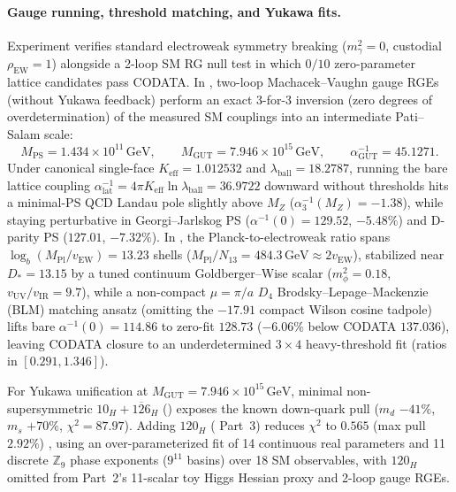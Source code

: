 \paragraph{Gauge running, threshold matching, and Yukawa fits.}
Experiment  verifies standard electroweak symmetry breaking ($m_\gamma^2 = 0$, custodial
$\rho_{\mathrm{EW}} = 1$) alongside a 2-loop SM RG null test in which $0/10$ zero-parameter lattice candidates pass
CODATA. In , two-loop Machacek--Vaughn gauge RGEs \cite{machacek1983} (without Yukawa feedback)
perform an exact 3-for-3 inversion (zero degrees of overdetermination) of the measured SM couplings into an
intermediate Pati--Salam scale:
\begin{equation}
M_{\mathrm{PS}} = 1.434 \times 10^{11}\,\mathrm{GeV},
\qquad
M_{\mathrm{GUT}} = 7.946 \times 10^{15}\,\mathrm{GeV},
\qquad
\alpha_{\mathrm{GUT}}^{-1} = 45.1271.
\label{eq:ps-gut}
\end{equation}
Under canonical single-face $K_{\mathrm{eff}} = 1.012532$ and $\lambda_{\mathrm{ball}} = 18.2787$, running the bare
lattice coupling $\alpha_{\mathrm{lat}}^{-1} = 4\pi K_{\mathrm{eff}} \ln\lambda_{\mathrm{ball}} = 36.9722$ downward
without thresholds hits a minimal-PS QCD Landau pole slightly above $M_Z$ ($\alpha_3^{-1}(M_Z) = -1.38$), while staying
perturbative in Georgi--Jarlskog PS ($\alpha^{-1}(0) = 129.52$, $-5.48\%$) and D-parity PS ($127.01$, $-7.32\%$). In
, the Planck-to-electroweak ratio spans $\log_b(M_{\mathrm{Pl}}/v_{\mathrm{EW}}) = 13.23$ shells
($M_{\mathrm{Pl}}/N_{13} = 484.3\,\mathrm{GeV} \approx 2 v_{\mathrm{EW}}$), stabilized near $D_* = 13.15$ by a tuned
continuum Goldberger--Wise scalar \cite{goldberger1999} ($m_\phi^2 = 0.18$, $v_{\mathrm{UV}}/v_{\mathrm{IR}} = 9.7$),
while a non-compact $\mu = \pi/a$ $D_4$ Brodsky--Lepage--Mackenzie (BLM) matching ansatz \cite{brodsky1983} (omitting
the $-17.91$ compact Wilson cosine tadpole) lifts bare $\alpha^{-1}(0) = 114.86$ to zero-fit $128.73$ ($-6.06\%$ below
CODATA $137.036$), leaving CODATA closure to an underdetermined $3 \times 4$ heavy-threshold fit (ratios in
$[0.291, 1.346]$).

For Yukawa unification at $M_{\mathrm{GUT}} = 7.946 \times 10^{15}\,\mathrm{GeV}$, minimal non-supersymmetric
$10_H + \overline{126}_H$ () exposes the known down-quark pull ($m_d$ $-41\%$, $m_s$ $+70\%$,
$\chi^2 = 87.97$). Adding $120_H$ ( Part~3) reduces $\chi^2$ to $0.565$ (max pull $2.92\%$)
\cite{dueck2013}, using an over-parameterized fit of 14 continuous real parameters and 11 discrete $\mathbb{Z}_9$ phase
exponents ($9^{11}$ basins) over 18 SM observables, with $120_H$ omitted from Part~2's 11-scalar toy Higgs Hessian
proxy and 2-loop gauge RGEs.

